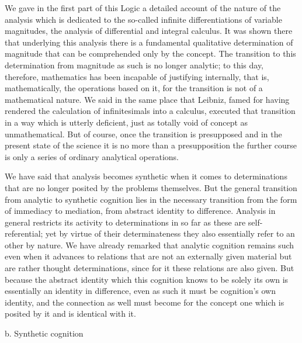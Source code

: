 We gave in the first part of this Logic
a detailed account of the nature of the analysis
which is dedicated to the so-called
infinite differentiations of variable magnitudes,
the analysis of differential and integral calculus.
It was shown there that underlying this analysis
there is a fundamental qualitative determination of magnitude
that can be comprehended only by the concept.
The transition to this determination from magnitude
as such is no longer analytic;
to this day, therefore, mathematics has been
incapable of justifying internally,
that is, mathematically, the operations based on it,
for the transition is not of a mathematical nature.
We said in the same place that Leibniz,
famed for having rendered the calculation of
infinitesimals into a calculus,
executed that transition in a way
which is utterly deficient,
just as totally void of concept as unmathematical.
But of course, once the transition is presupposed
and in the present state of the science
it is no more than a presupposition
the further course is only a series of
ordinary analytical operations.

We have said that analysis becomes synthetic
when it comes to determinations that are
no longer posited by the problems themselves.
But the general transition from
analytic to synthetic cognition
lies in the necessary transition from
the form of immediacy to mediation,
from abstract identity to difference.
Analysis in general restricts its activity
to determinations in so far as
these are self-referential;
yet by virtue of their determinateness
they also essentially refer to an other by nature.
We have already remarked that
analytic cognition remains such even
when it advances to relations that
are not an externally given material
but are rather thought determinations,
since for it these relations are also given.
But because the abstract identity
which this cognition knows to be solely its own is
essentially an identity in difference,
even as such it must be cognition's own identity,
and the connection as well must become for the concept
one which is posited by it
and is identical with it.

b. Synthetic cognition

